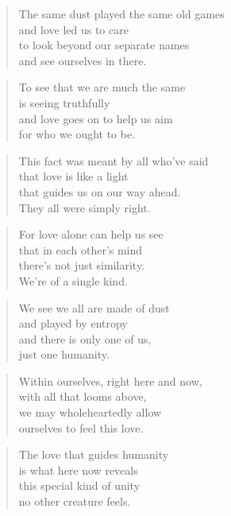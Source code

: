 \documentclass[10pt,a4paper]{article}
\begin{document}
\begin{multicols}{2}
\begin{verse}
The same dust played the same old games\\
and love led us to care\\
to look beyond our separate names\\
and see ourselves in there.
\end{verse}

\begin{verse}
To see that we are much the same\\
is seeing truthfully\\
and love goes on to help us aim\\
for who we ought to be.
\end{verse}

\begin{verse}
This fact was meant by all who’ve said\\
that love is like a light\\
that guides us on our way ahead.\\
They all were simply right.
\end{verse}

\begin{verse}
For love alone can help us see\\
that in each other’s mind\\
there’s not just similarity.\\
We’re of a single kind.
\end{verse}

\begin{verse}
We see we all are made of dust\\
and played by entropy\\
and there is only one of us,\\
just one humanity.
\end{verse}

\begin{verse}
Within ourselves, right here and now,\\
with all that looms above,\\
we may wholeheartedly allow\\
ourselves to feel this love.
\end{verse}

\begin{verse}
The love that guides humanity\\
is what here now reveals\\
this special kind of unity\\
no other creature feels.
\end{verse}


\end{multicols}
\end{document}
